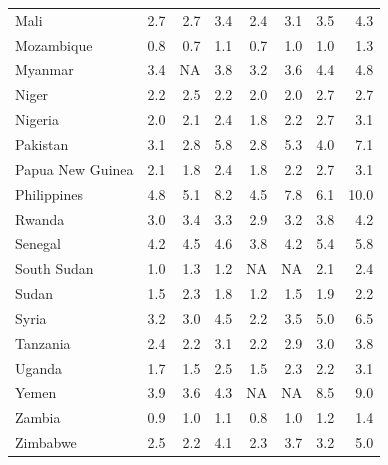 \begin{table}[h]
{\begin{tabular}[t]{lrrrrrrr}
Mali & 2.7 & 2.7 & 3.4 & 2.4 & 3.1 & 3.5 & 4.3\\
Mozambique & 0.8 & 0.7 & 1.1 & 0.7 & 1.0 & 1.0 & 1.3\\
Myanmar & 3.4 & NA & 3.8 & 3.2 & 3.6 & 4.4 & 4.8\\
Niger & 2.2 & 2.5 & 2.2 & 2.0 & 2.0 & 2.7 & 2.7\\
Nigeria & 2.0 & 2.1 & 2.4 & 1.8 & 2.2 & 2.7 & 3.1\\
Pakistan & 3.1 & 2.8 & 5.8 & 2.8 & 5.3 & 4.0 & 7.1\\
Papua New Guinea & 2.1 & 1.8 & 2.4 & 1.8 & 2.2 & 2.7 & 3.1\\
Philippines & 4.8 & 5.1 & 8.2 & 4.5 & 7.8 & 6.1 & 10.0\\
Rwanda & 3.0 & 3.4 & 3.3 & 2.9 & 3.2 & 3.8 & 4.2\\
Senegal & 4.2 & 4.5 & 4.6 & 3.8 & 4.2 & 5.4 & 5.8\\
South Sudan & 1.0 & 1.3 & 1.2 & NA & NA & 2.1 & 2.4\\
Sudan & 1.5 & 2.3 & 1.8 & 1.2 & 1.5 & 1.9 & 2.2\\
Syria & 3.2 & 3.0 & 4.5 & 2.2 & 3.5 & 5.0 & 6.5\\
Tanzania & 2.4 & 2.2 & 3.1 & 2.2 & 2.9 & 3.0 & 3.8\\
Uganda & 1.7 & 1.5 & 2.5 & 1.5 & 2.3 & 2.2 & 3.1\\
Yemen & 3.9 & 3.6 & 4.3 & NA & NA & 8.5 & 9.0\\
Zambia & 0.9 & 1.0 & 1.1 & 0.8 & 1.0 & 1.2 & 1.4\\
Zimbabwe & 2.5 & 2.2 & 4.1 & 2.3 & 3.7 & 3.2 & 5.0\\
\bottomrule
\end{tabular}}
\end{table}